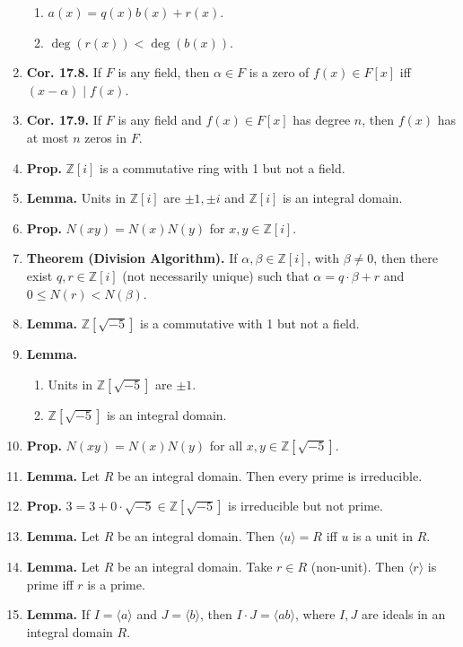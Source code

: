 \begin{enumerate}
	\begin{enumerate}
		\item $a(x) = q(x)b(x)+r(x)$. 
		\item $\deg(r(x)) < \deg(b(x))$. 
	\end{enumerate}
	\item \textbf{Cor. 17.8. } If $F$ is any field, then $\alpha \in F$ is a zero of $f(x) \in F[x]$ iff $(x-\alpha) \mid f(x)$. 
	\item \textbf{Cor. 17.9. } If $F$ is any field and $f(x) \in F[x]$ has degree $n$, then $f(x)$ has at most $n$ zeros in $F$. 
	\item \textbf{Prop. } $\mathbb{Z}[i]$ is a commutative ring with 1 but not a field. 	
	\item \textbf{Lemma. } Units in $\mathbb{Z}[i]$ are $\pm 1, \pm i$ and $\mathbb{Z}[i]$ is an integral domain. 	
	\item \textbf{Prop. } $N(xy)=N(x)N(y)$ for $x,y \in \mathbb{Z}[i]$. 
	\item \textbf{Theorem (Division Algorithm). } If $\alpha, \beta \in \mathbb{Z}[i]$, with $\beta \neq 0$, then there exist $q,r \in \mathbb{Z}[i]$ (not necessarily unique) such that $\alpha = q \cdot \beta + r$ and $0 \leq N(r) < N(\beta)$. 
	\item \textbf{Lemma. } $\mathbb{Z}[\sqrt{-5}]$ is a commutative with 1 but not a field. 
	\item \textbf{Lemma. } 
	\begin{enumerate}
		\item Units in $\mathbb{Z}[\sqrt{-5}]$ are $\pm 1$. 
		\item $\mathbb{Z}[\sqrt{-5}]$ is an integral domain. 
	\end{enumerate}
	\item \textbf{Prop. } $N(xy) = N(x)N(y)$ for all $x,y \in \mathbb{Z}[\sqrt{-5}]$. 
	\item \textbf{Lemma. } Let $R$ be an integral domain. Then every prime is irreducible. 
	\item \textbf{Prop. } $3 = 3 + 0 \cdot \sqrt{-5} \in \mathbb{Z}[\sqrt{-5}]$ is irreducible but not prime. 
	\item \textbf{Lemma. } Let $R$ be an integral domain. Then $\langle u \rangle = R$ iff $u$ is a unit in $R$. 
	\item \textbf{Lemma. } Let $R$ be an integral domain. Take $r \in R$ (non-unit). Then $\langle r \rangle$ is prime iff $r$ is a prime. 
	\item \textbf{Lemma. } If $I = \langle a \rangle$ and $J = \langle b \rangle$, then $I \cdot J = \langle ab \rangle$, where $I,J$ are ideals in an integral domain $R$. 

\end{enumerate}
